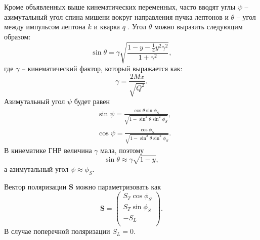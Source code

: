 \documentclass{extarticle}
\begin{document}
Кроме объявленных выше кинематических переменных, часто вводят углы $\psi$ -- азимутальный угол спина мишени вокруг направления пучка лептонов и $\theta$ -- угол между импульсом лептона $k$ и кварка $q$ \cite{Diehl}. Угол $\theta$ можно выразить следующим образом:
\begin{equation}
	\sin \theta = \gamma \sqrt{\frac{1-y-\frac{1}{4}y^2 \gamma^2}{1+\gamma^2}},
\end{equation} 
где $\gamma$ -- кинематический фактор, который выражается как:
\begin{equation}
	\gamma = \frac{2Mx}{\sqrt{Q^2}}.
\end{equation}
Азимутальный угол $\psi$ будет равен
\begin{equation}
	\begin{split}
		 & \sin \psi = \frac{\cos \theta \sin \phi_S}{\sqrt{1-\sin^2 \theta \sin^2 \phi_S}}, \\
		 & \cos \psi = \frac{\cos \phi_S}{\sqrt{1-\sin^2 \theta \sin^2 \phi_S}}.
	\end{split}
\end{equation}
В кинематике ГНР величина $\gamma$ мала, поэтому
\begin{equation}
	\sin \theta \approx \gamma \sqrt{1-y},
\end{equation}
а азимутальный угол $\psi \approx \phi_S$.

Вектор поляризации $\textbf{S}$ можно параметризовать как
\begin{equation}
	\textbf{S} = \begin{pmatrix}
			S_T \cos \phi_S \\ S_T \sin \phi_S\\ -S_L \\ 
	\end{pmatrix}.
\end{equation}
В случае поперечной поляризации $S_L = 0$.
\end{document}
